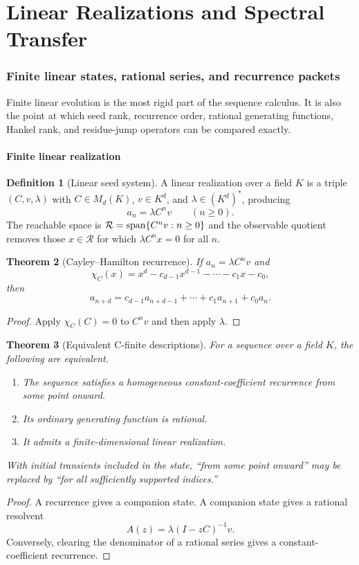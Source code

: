\documentclass[11pt]{article}
\newtheorem{theorem}{Theorem}[section]\newtheorem{proposition}[theorem]{Proposition}\newtheorem{lemma}[theorem]{Lemma}\newtheorem{corollary}[theorem]{Corollary}
\theoremstyle{definition}\newtheorem{definition}[theorem]{Definition}\newtheorem{example}[theorem]{Example}\newtheorem{construction}[theorem]{Construction}\newtheorem{algorithm}[theorem]{Algorithm}\newtheorem{conjecture}[theorem]{Conjecture}\newtheorem{problem}[theorem]{Problem}
\theoremstyle{remark}\newtheorem{remark}[theorem]{Remark}\newtheorem{boundary}[theorem]{Boundary}\newtheorem{certificate}[theorem]{Computational Certificate}\newtheorem{classical}[theorem]{Classical Input}\newtheorem{principle}[theorem]{Structural Principle}
\begin{document}


\part{Linear Realizations and Spectral Transfer}
\section{Finite linear states, rational series, and recurrence packets}

Finite linear evolution is the most rigid part of the sequence calculus.  It is also the point at which seed rank, recurrence order, rational generating functions, Hankel rank, and residue-jump operators can be compared exactly.

\subsection{Finite linear realization}
\begin{definition}[Linear seed system]
A linear realization over a field $K$ is a triple $(C,v,\lambda)$ with $C\in M_d(K)$, $v\in K^d$, and $\lambda\in (K^d)^*$, producing
\[
 a_n=\lambda C^n v\qquad(n\geq0).
\]
The reachable space is $\mathcal R=\operatorname{span}\{C^nv:n\geq0\}$ and the observable quotient removes those $x\in\mathcal R$ for which $\lambda C^nx=0$ for all $n$.
\end{definition}

\begin{theorem}[Cayley--Hamilton recurrence]
If $a_n=\lambda C^nv$ and
\[
 \chi_C(x)=x^d-c_{d-1}x^{d-1}-\cdots-c_1x-c_0,
\]
then
\[
 \boxed{a_{n+d}=c_{d-1}a_{n+d-1}+\cdots+c_1a_{n+1}+c_0a_n.}
\]
\end{theorem}
\begin{proof}
Apply $\chi_C(C)=0$ to $C^nv$ and then apply $\lambda$.
\end{proof}

\begin{theorem}[Equivalent C-finite descriptions]
For a sequence over a field $K$, the following are equivalent.
\begin{enumerate}[label=\textup{(\roman*)}]
\item The sequence satisfies a homogeneous constant-coefficient recurrence from some point onward.
\item Its ordinary generating function is rational.
\item It admits a finite-dimensional linear realization.
\end{enumerate}
With initial transients included in the state, ``from some point onward'' may be replaced by ``for all sufficiently supported indices.''
\end{theorem}
\begin{proof}
A recurrence gives a companion state.  A companion state gives a rational resolvent
\[
 A(z)=\lambda(I-zC)^{-1}v.
\]
Conversely, clearing the denominator of a rational series gives a constant-coefficient recurrence.
\end{proof}
\end{document}
